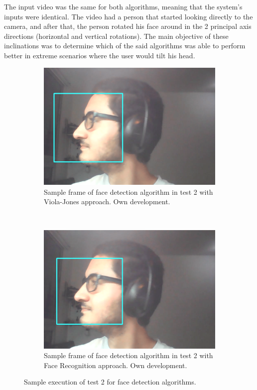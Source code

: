 \documentclass[11pt]{report} %
\begin{document}
The input video was the same for both algorithms, meaning that the system's inputs were identical. The video had a person that started looking directly to the camera, and after that, the person rotated his face around in the 2 principal axis directions (horizontal and vertical rotations). The main objective of these inclinations was to determine which of the said algorithms was able to perform better in extreme scenarios where the user would tilt his head.\\


\begin{figure}[H]
	\centering
	\begin{subfigure}{.5\textwidth}
		\centering
		\includegraphics[width=1.0\linewidth]{assets/imgs/computer_vision/face_detection_ex_2_hc.png}
		\caption{Sample frame of face detection algorithm in test 2 with Viola-Jones approach. Own development.}
		\label{fig_computer_vision_test_2_a}
	\end{subfigure}~
	\begin{subfigure}{.5\textwidth}
		\centering
		\includegraphics[width=1.0\linewidth]{assets/imgs/computer_vision/face_detection_ex_2_fr.png}
		\caption{Sample frame of face detection algorithm in test 2 with Face Recognition approach. Own development.}
		\label{fig_computer_vision_test_2_b}
	\end{subfigure}%
	\caption{Sample execution of test 2 for face detection algorithms.}
	\label{fig_computer_vision_test_2}
\end{figure}
\end{document}
